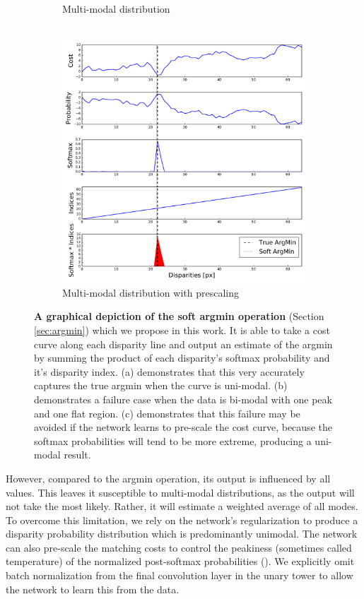 \begin{figure}[t]
\begin{center}
\begin{subfigure}[b]{0.32\linewidth}
	        \caption{Multi-modal distribution\\~}
		\end{subfigure}
    		\begin{subfigure}[b]{0.32\linewidth}
			\includegraphics[width=\linewidth]{argmin/soft_argmin_multimodal_prescaling.pdf}
	        \caption{Multi-modal distribution with prescaling}
		\end{subfigure}
	\end{center}
	\caption[A graphical depiction of the soft argmin operation.]{\textbf{A graphical depiction of the soft argmin operation} (Section \ref{sec:argmin}) which we propose in this work. It is able to take a cost curve along each disparity line and output an estimate of the argmin by summing the product of each disparity's softmax probability and it's disparity index. (a) demonstrates that this very accurately captures the true argmin when the curve is uni-modal. (b) demonstrates a failure case when the data is bi-modal with one peak and one flat region. (c) demonstrates that this failure may be avoided if the network learns to pre-scale the cost curve, because the softmax probabilities will tend to be more extreme, producing a uni-modal result.}
	\label{fig:argmin}
\end{figure}

However, compared to the argmin operation, its output is influenced by all values. This leaves it susceptible to multi-modal distributions, as the output will not take the most likely. Rather, it will estimate a weighted average of all modes. To overcome this limitation, we rely on the network's regularization to produce a disparity probability distribution which is predominantly unimodal. The network can also pre-scale the matching costs to control the peakiness (sometimes called temperature) of the normalized post-softmax probabilities (). We explicitly omit batch normalization from the final convolution layer in the unary tower to allow the network to learn this from the data.

